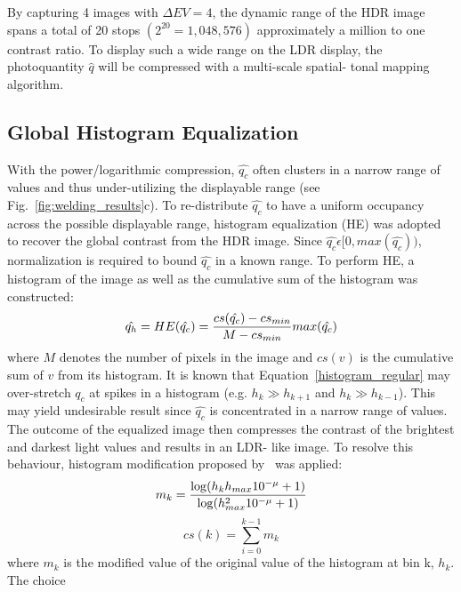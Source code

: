 By capturing 4 images with $\Delta EV=4$, the dynamic range of the HDR image spans a total of 20 
stops $(2^{20}=1,048,576)$ approximately a million to one contrast ratio. To display such a wide 
range on the LDR display, the photoquantity $\hat{q}$ will be compressed with a multi-scale spatial-
tonal mapping algorithm.
%
%

\subsection{Global Histogram Equalization}
With the power/logarithmic compression, $\hat{q_c}$ often clusters in a narrow range of values and 
thus under-utilizing the displayable range (see Fig.~\ref{fig:welding_results}c). To re-distribute $
\hat{q_c}$ to have a uniform occupancy across the possible displayable range, histogram 
equalization (HE) was adopted to recover the global contrast from the HDR image. Since $\hat{q_c}
\epsilon[0,max(\hat{q_c}))$, normalization is required to bound $\hat{q_c}$ in a known range. To 
perform HE, a histogram of the image as well as the cumulative sum of the histogram was 
constructed:
\begin{equation} \label{histogram_regular}
 \hat{q_h}=HE(\hat{q_c})=\frac{cs(\hat{q_c})-cs_{min}}{M-cs_{min}}max(\hat{q_c})\\
\end{equation}
where $M$ denotes the number of pixels in the image and $cs(v)$ is the cumulative sum of $v$ from 
its histogram. It is known that Equation~\ref{histogram_regular} may over-stretch $\hat{q_c}$ at 
spikes in a histogram (e.g. $h_k \gg h_{k+1}$ and $h_k \gg h_{k-1}$). This may yield undesirable 
result since $\hat{q_c}$ is concentrated in a narrow range of values. The outcome of the equalized 
image then compresses the contrast of the brightest and darkest light values and results in an LDR-
like image. To resolve this behaviour, histogram modification proposed by~\cite{lee2012power} was 
applied:
\begin{equation} \label{histogram_regular}
 m_k=\frac{\log(h_kh_{max}10^{-\mu}+1)}{\log(h_{max}^{2}10^{-\mu}+1)}\\ 
\end{equation}
\begin{equation}
 cs(k)=\displaystyle\sum\limits_{i=0}^{k-1}m_k
\end{equation}
where $m_k$ is the modified value of the original value of the histogram at bin k, $h_k$. The choice 
